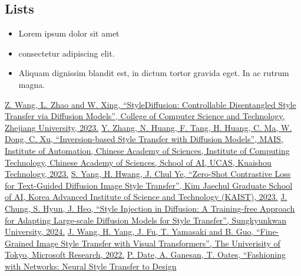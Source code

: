 \documentclass{article}
\begin{document}
\subsection{Lists}
\begin{itemize}
	\item Lorem ipsum dolor sit amet
	\item consectetur adipiscing elit.
	\item Aliquam dignissim blandit est, in dictum tortor gravida eget. In ac rutrum magna.
\end{itemize}


% 
% 


\renewcommand{\bibname}{References}
\addcontentsline{toc}{section}{\bibname}

\begin{thebibliography}{9} 
    \href{https://arxiv.org/pdf/2308.07863}{Z. Wang, L. Zhao and W. Xing, “StyleDiffusion: Controllable Disentangled Style Transfer via Diffusion Models”, College of Computer Science and Technology, Zhejiang University, 2023.}
     \href{https://openaccess.thecvf.com/content/CVPR2023/papers/Zhang_Inversion-Based_Style_Transfer_With_Diffusion_Models_CVPR_2023_paper.pdf}{Y. Zhang, N. Huang, F. Tang, H. Huang, C. Ma, W. Dong, C. Xu, “Inversion-based Style Transfer with Diffusion Models”, MAIS, Institute of Automation, Chinese Academy of Sciences, Institute of Computing Technology, Chinese Academy of Sciences, School of AI, UCAS, Kuaishou Technology, 2023.}
     \href{https://openaccess.thecvf.com/content/ICCV2023/papers/Yang_Zero-Shot_Contrastive_Loss_for_Text-Guided_Diffusion_Image_Style_Transfer_ICCV_2023_paper.pdf}{S. Yang, H. Hwang, J. Chul Ye, “Zero-Shot Contrastive Loss for Text-Guided Diffusion Image Style Transfer”, Kim Jaechul Graduate School of AI, Korea Advanced Institute of Science and Technology (KAIST), 2023.}
    \href{https://arxiv.org/pdf/2312.09008}{J. Chung, S. Hyun, J. Heo, “Style Injection in Diffusion: A Training-free Approach
    for Adapting Large-scale Diffusion Models for Style Transfer”, Sungkyunkwan University, 2024.}
    \href{https://arxiv.org/pdf/2210.05176v1}{J. Wang, H. Yang, J. Fu, T. Yamasaki and B. Guo, “Fine-Grained Image Style Transfer
    with Visual Transformers”,  The Univerisity of Tokyo, Microsoft Research, 2022.}
    \href{https://arxiv.org/pdf/1707.09899}{P. Date, A. Ganesan, T. Oates, “Fashioning with Networks: Neural Style Transfer to Design
}
\end{thebibliography}
\end{document}
